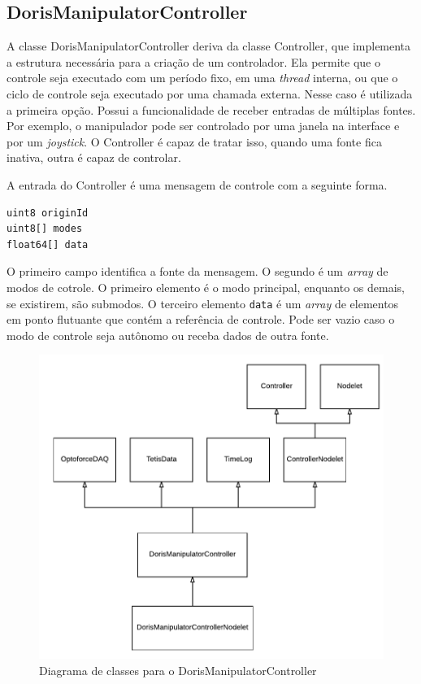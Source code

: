 \subsection{DorisManipulatorController}

A classe DorisManipulatorController deriva da classe Controller, que implementa a estrutura necessária para a criação de um controlador. Ela permite que o controle seja executado com um período fixo, em uma \textit{thread} interna, ou que o ciclo de controle seja executado por uma chamada externa. Nesse caso é utilizada a primeira opção. Possui a funcionalidade de receber entradas de múltiplas fontes. Por exemplo, o manipulador pode ser controlado por uma janela na interface e por um \textit{joystick}. O Controller é capaz de tratar isso, quando uma fonte fica inativa, outra é capaz de controlar. 

A entrada do Controller é uma mensagem de controle com a seguinte forma.

\begin{lstlisting}[caption=Control.msg]
uint8 originId
uint8[] modes
float64[] data
\end{lstlisting}

O primeiro campo identifica a fonte da mensagem. O segundo é um \textit{array} de modos de cotrole. O primeiro elemento é o modo principal, enquanto os demais, se existirem, são submodos. O terceiro elemento \verb|data| é um \textit{array} de elementos em ponto flutuante que contém a referência de controle. Pode ser vazio caso o modo de controle seja autônomo ou receba dados de outra fonte.

\begin{figure}[!h]
  \centering
  \includegraphics[width=0.9\linewidth]{./img/class_diagram}
  \caption{Diagrama de classes para o DorisManipulatorController}
  \label{fig:classes}
\end{figure}

